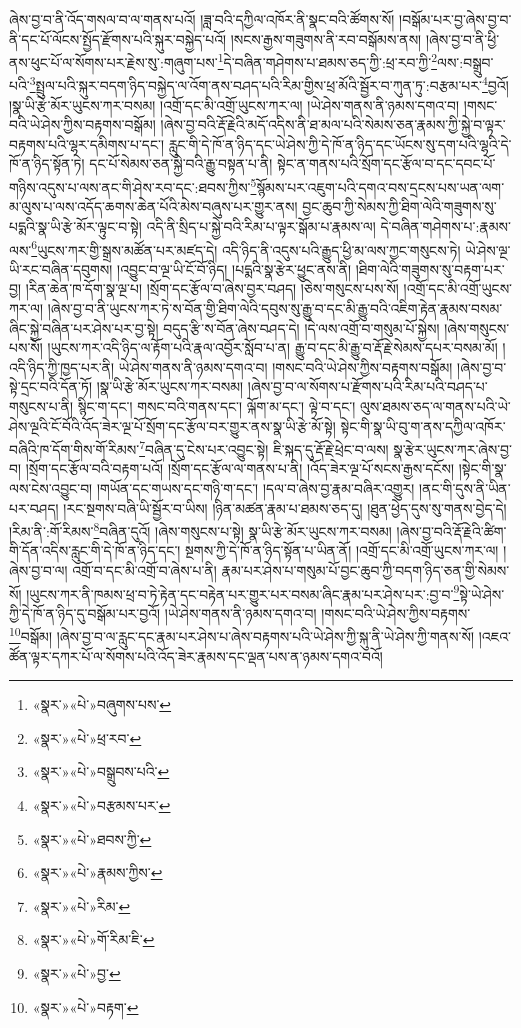 ཞེས་བྱ་བ་ནི་འོད་གསལ་བ་ལ་གནས་པའོ། །ཟླ་བའི་དཀྱིལ་འཁོར་ནི་སྣང་བའི་ཚོགས་སོ། །བསྒོམ་པར་བྱ་ཞེས་བྱ་བ་ནི་དང་པོ་ལོངས་སྤྱོད་རྫོགས་པའི་སྐུར་བསྐྱེད་པའོ། །སངས་རྒྱས་གཟུགས་ནི་རབ་བསྒོམས་ནས། །ཞེས་བྱ་བ་ནི་ཕྱི་ནས་ཕུང་པོ་ལ་སོགས་པར་རྗེས་སུ་:གཞུག་པས་\footnote{«སྣར་»«པེ་»བཞུགས་པས་}དེ་བཞིན་གཤེགས་པ་ཐམས་ཅད་ཀྱི་:ཕྲ་རབ་ཀྱི་\footnote{«སྣར་»«པེ་»ཕྲ་རབ་}ལས་:བསྒྲུབ་པའི་\footnote{«སྣར་»«པེ་»བསྒྲུབས་པའི་}སྤྲུལ་པའི་སྐུར་བདག་ཉིད་བསྐྱེད་ལ་འོག་ནས་བཤད་པའི་རིམ་གྱིས་ཕྲ་མོའི་སྦྱོར་བ་ཀུན་ཏུ་:བརྩམ་པར་\footnote{«སྣར་»«པེ་»བརྩམས་པར་}བྱའོ། །སྣ་ཡི་རྩེ་མོར་ཡུངས་ཀར་བསམ། །འགྲོ་དང་མི་འགྲོ་ཡུངས་ཀར་ལ། །ཡེ་ཤེས་གནས་ནི་ཉམས་དགའ་བ། །གསང་བའི་ཡེ་ཤེས་ཀྱིས་བརྟགས་བསྒོམ། །ཞེས་བྱ་བའི་རྡོ་རྗེའི་མདོ་འདིས་ནི་ཐ་མལ་པའི་སེམས་ཅན་རྣམས་ཀྱི་སྐྱེ་བ་ལྟར་བརྟགས་པའི་ལྷར་དམིགས་པ་དང་། རླུང་གི་དེ་ཁོ་ན་ཉིད་དང་ཡེ་ཤེས་ཀྱི་དེ་ཁོ་ན་ཉིད་དང་ཡོངས་སུ་དག་པའི་ལྷའི་དེ་ཁོ་ན་ཉིད་སྟོན་ཏེ། དང་པོ་སེམས་ཅན་སྐྱེ་བའི་རྒྱུ་བསྟན་པ་ནི། སྟེང་ན་གནས་པའི་སྲོག་དང་རྩོལ་བ་དང་དབང་པོ་གཉིས་འདུས་པ་ལས་ནང་གི་ཤེས་རབ་དང་:ཐབས་ཀྱིས་\footnote{«སྣར་»«པེ་»ཐབས་ཀྱི་}སྙོམས་པར་འཇུག་པའི་དགའ་བས་དྲངས་པས་ཡན་ལག་མ་ལུས་པ་ལས་འདོད་ཆགས་ཆེན་པོའི་མེས་བཞུས་པར་གྱུར་ནས། བྱང་ཆུབ་ཀྱི་སེམས་ཀྱི་ཐིག་ལེའི་གཟུགས་སུ་པདྨའི་སྣ་ཡི་རྩེ་མོར་ལྟུང་བ་སྟེ། འདི་ནི་སྲིད་པ་སྐྱེ་བའི་རིམ་པ་ལྟར་སྒོམ་པ་རྣམས་ལ། དེ་བཞིན་གཤེགས་པ་:རྣམས་ལས་\footnote{«སྣར་»«པེ་»རྣམས་ཀྱིས་}ཡུངས་ཀར་གྱི་སྒྲས་མཚོན་པར་མཛད་དེ། འདི་ཉིད་ནི་འདུས་པའི་རྒྱུད་ཕྱི་མ་ལས་ཀྱང་གསུངས་ཏེ། ཡེ་ཤེས་ལྔ་ཡི་རང་བཞིན་དབུགས། །འབྱུང་བ་ལྔ་ཡི་ངོ་བོ་ཉིད། །པདྨའི་སྣ་རྩེར་ཕྱུང་ནས་ནི། །ཐིག་ལེའི་གཟུགས་སུ་བརྟག་པར་བྱ། །རིན་ཆེན་ཁ་དོག་སྣ་ལྔ་པ། །སྲོག་དང་རྩོལ་བ་ཞེས་བྱར་བཤད། །ཅེས་གསུངས་པས་སོ། །འགྲོ་དང་མི་འགྲོ་ཡུངས་ཀར་ལ། །ཞེས་བྱ་བ་ནི་ཡུངས་ཀར་ཏེ་ས་བོན་གྱི་ཐིག་ལེའི་དབུས་སུ་རྒྱུ་བ་དང་མི་རྒྱུ་བའི་འཇིག་རྟེན་རྣམས་བསམ་ཞིང་སྐྱེ་བཞིན་པར་ཤེས་པར་བྱ་སྟེ། བདུད་རྩི་ས་བོན་ཞེས་བཤད་དེ། །དེ་ལས་འགྲོ་བ་གསུམ་པོ་སྐྱེས། །ཞེས་གསུངས་པས་སོ། །ཡུངས་ཀར་འདི་ཉིད་ལ་རྟོག་པའི་རྣལ་འབྱོར་སློབ་པ་ན། རྒྱུ་བ་དང་མི་རྒྱུ་བ་རྡོ་རྗེ་སེམས་དཔར་བསམ་མོ། །འདི་ཉིད་ཀྱི་ཁྱད་པར་ནི། ཡེ་ཤེས་གནས་ནི་ཉམས་དགའ་བ། །གསང་བའི་ཡེ་ཤེས་ཀྱིས་བརྟགས་བསྒོམ། །ཞེས་བྱ་བ་སྟེ་དྲང་བའི་དོན་ཏོ། །སྣ་ཡི་རྩེ་མོར་ཡུངས་ཀར་བསམ། །ཞེས་བྱ་བ་ལ་སོགས་པ་རྫོགས་པའི་རིམ་པའི་བཤད་པ་གསུངས་པ་ནི། སྙིང་ག་དང་། གསང་བའི་གནས་དང་། ལྐོག་མ་དང་། ལྟེ་བ་དང་། ལུས་ཐམས་ཅད་ལ་གནས་པའི་ཡེ་ཤེས་ལྔའི་ངོ་བོའི་འོད་ཟེར་ལྔ་པོ་སྲོག་དང་རྩོལ་བར་གྱུར་ནས་སྣ་ཡི་རྩེ་མོ་སྟེ། སྟེང་གི་སྣ་ཡི་བུ་ག་ནས་དཀྱིལ་འཁོར་བཞིའི་ཁ་དོག་གིས་གོ་རིམས་\footnote{«སྣར་»«པེ་»རིམ་}བཞིན་དུ་ངེས་པར་འབྱུང་སྟེ། ཇི་སྐད་དུ་རྡོ་རྗེ་ཕྲེང་བ་ལས། སྣ་རྩེར་ཡུངས་ཀར་ཞེས་བྱ་བ། །སྲོག་དང་རྩོལ་བའི་བརྟག་པའོ། །སྲོག་དང་རྩོལ་ལ་གནས་པ་ནི། །འོད་ཟེར་ལྔ་པོ་སངས་རྒྱས་དངོས། །སྟེང་གི་སྣ་ལས་ངེས་འབྱུང་བ། །གཡོན་དང་གཡས་དང་གཉི་ག་དང་། །དལ་བ་ཞེས་བྱ་རྣམ་བཞིར་འགྱུར། །ནང་གི་དུས་ནི་ཡིན་པར་བཤད། །རང་སྔགས་བཞི་ཡི་སྦྱོར་བ་ཡིས། །ཉིན་མཚན་རྣམ་པ་ཐམས་ཅད་དུ། །ཐུན་ཕྱེད་དུས་སུ་གནས་བྱེད་དེ། །རིམ་ནི་:གོ་རིམས་\footnote{«སྣར་»«པེ་»གོ་རིམ་ཇི་}བཞིན་དུའོ། །ཞེས་གསུངས་པ་སྟེ། སྣ་ཡི་རྩེ་མོར་ཡུངས་ཀར་བསམ། །ཞེས་བྱ་བའི་རྡོ་རྗེའི་ཚིག་གི་དོན་འདིས་རླུང་གི་དེ་ཁོ་ན་ཉིད་དང་། སྔགས་ཀྱི་དེ་ཁོ་ན་ཉིད་སྟོན་པ་ཡིན་ནོ། །འགྲོ་དང་མི་འགྲོ་ཡུངས་ཀར་ལ། །ཞེས་བྱ་བ་ལ། འགྲོ་བ་དང་མི་འགྲོ་བ་ཞེས་པ་ནི། རྣམ་པར་ཤེས་པ་གསུམ་པོ་བྱང་ཆུབ་ཀྱི་བདག་ཉིད་ཅན་གྱི་སེམས་སོ། །ཡུངས་ཀར་ནི་ཁམས་ཕྲ་བ་ཏེ་རྟེན་དང་བརྟེན་པར་གྱུར་པར་བསམ་ཞིང་རྣམ་པར་ཤེས་པར་:བྱ་བ་\footnote{«སྣར་»«པེ་»བྱ་}སྟེ་ཡེ་ཤེས་ཀྱི་དེ་ཁོ་ན་ཉིད་དུ་བསྒོམ་པར་བྱའོ། །ཡེ་ཤེས་གནས་ནི་ཉམས་དགའ་བ། །གསང་བའི་ཡེ་ཤེས་ཀྱིས་བརྟགས་\footnote{«སྣར་»«པེ་»བརྟག་}བསྒོམ། །ཞེས་བྱ་བ་ལ་རླུང་དང་རྣམ་པར་ཤེས་པ་ཞེས་བརྟགས་པའི་ཡེ་ཤེས་ཀྱི་སྐུ་ནི་ཡེ་ཤེས་ཀྱི་གནས་སོ། །འཇའ་ཚོན་ལྟར་དཀར་པོ་ལ་སོགས་པའི་འོད་ཟེར་རྣམས་དང་ལྡན་པས་ན་ཉམས་དགའ་བའོ། 